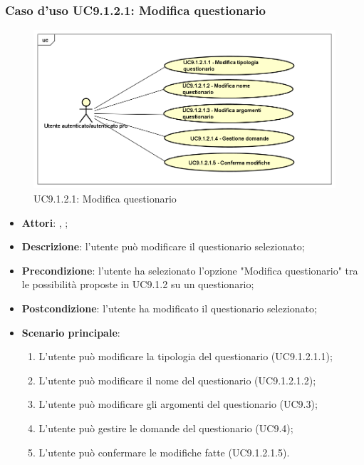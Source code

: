 			\subsubsection{Caso d'uso UC9.1.2.1: Modifica questionario}
			\label{UC9.1.2.1}
			\begin{figure}[h]
				\centering
			\includegraphics[scale=0.5,keepaspectratio]{UML/UC9_1_2_1.png}
				\caption{UC9.1.2.1: Modifica questionario}
			\end{figure}
			\FloatBarrier
			\begin{itemize}
				\item \textbf{Attori}: \uau, \uaupro;
				\item \textbf{Descrizione}: l'utente può modificare il questionario selezionato;
				\item \textbf{Precondizione}: l'utente ha selezionato l'opzione "Modifica questionario" tra le possibilità proposte in UC9.1.2 su un questionario;
				\item \textbf{Postcondizione}: l'utente ha modificato il questionario selezionato; 
				\item \textbf{Scenario principale}:
					\begin{enumerate}
						\item L'utente può modificare la tipologia del questionario (UC9.1.2.1.1);
						\item L'utente può modificare il nome del questionario (UC9.1.2.1.2);
						\item L'utente può modificare gli argomenti del questionario (UC9.3);
						\item L'utente può gestire le domande del questionario (UC9.4);
						\item L'utente può confermare le modifiche fatte (UC9.1.2.1.5).
					\end{enumerate}
			\end{itemize}
			
